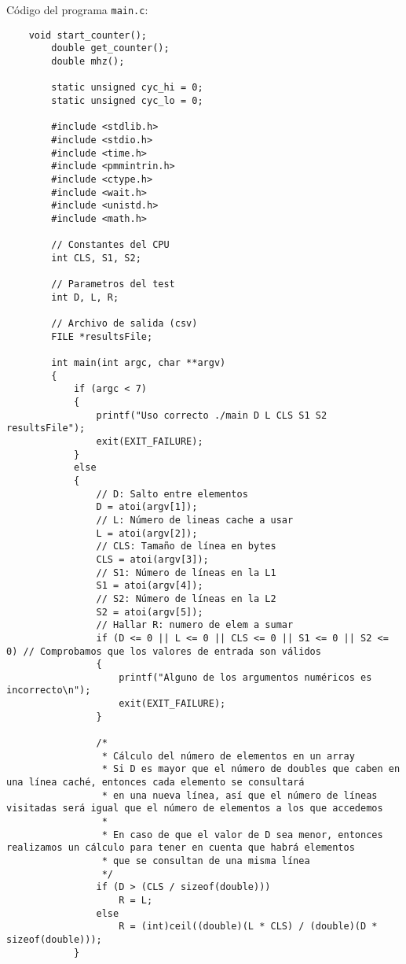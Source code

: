 \documentclass[a4paper,twocolumn]{article}
\begin{document}
	\newpage
	\onecolumn
	\large{Código del programa \texttt{main.c}:}
	\begin{lstlisting}
    void start_counter();
        double get_counter();
        double mhz();
        
        static unsigned cyc_hi = 0;
        static unsigned cyc_lo = 0;
        
        #include <stdlib.h>
        #include <stdio.h>
        #include <time.h>
        #include <pmmintrin.h>
        #include <ctype.h>
        #include <wait.h>
        #include <unistd.h>
        #include <math.h>
        
        // Constantes del CPU
        int CLS, S1, S2;
        
        // Parametros del test
        int D, L, R;
        
        // Archivo de salida (csv)
        FILE *resultsFile;
        
        int main(int argc, char **argv)
        {
            if (argc < 7)
            {
                printf("Uso correcto ./main D L CLS S1 S2 resultsFile");
                exit(EXIT_FAILURE);
            }
            else
            {
                // D: Salto entre elementos
                D = atoi(argv[1]);
                // L: Número de lineas cache a usar
                L = atoi(argv[2]);
                // CLS: Tamaño de línea en bytes
                CLS = atoi(argv[3]);
                // S1: Número de líneas en la L1
                S1 = atoi(argv[4]);
                // S2: Número de líneas en la L2
                S2 = atoi(argv[5]);
                // Hallar R: numero de elem a sumar
                if (D <= 0 || L <= 0 || CLS <= 0 || S1 <= 0 || S2 <= 0) // Comprobamos que los valores de entrada son válidos
                {
                    printf("Alguno de los argumentos numéricos es incorrecto\n");
                    exit(EXIT_FAILURE);
                }
        
                /*
                 * Cálculo del número de elementos en un array
                 * Si D es mayor que el número de doubles que caben en una línea caché, entonces cada elemento se consultará
                 * en una nueva línea, así que el número de líneas visitadas será igual que el número de elementos a los que accedemos
                 *
                 * En caso de que el valor de D sea menor, entonces realizamos un cálculo para tener en cuenta que habrá elementos
                 * que se consultan de una misma línea
                 */
                if (D > (CLS / sizeof(double)))
                    R = L;
                else
                    R = (int)ceil((double)(L * CLS) / (double)(D * sizeof(double)));
            }
        

\end{lstlisting}
\end{document}
